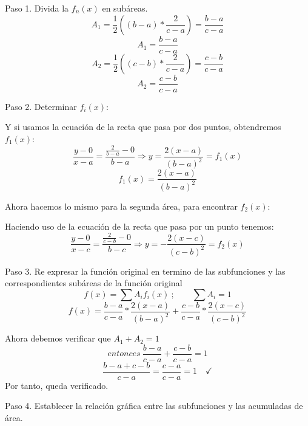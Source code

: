 \documentclass[11pt,letterpaper]{report}
\begin{document}
Paso 1. Divida la $f_n(x)$ en subáreas.
\[
A_1 = \frac{1}{2}\left((b-a) * \frac{2}{c-a}\right) = \frac{b-a}{c-a}
\]
\[
\boxed{A_1 = \frac{b-a}{c-a}}
\]
\[
A_2 = \frac{1}{2}\left((c-b) * \frac{2}{c-a}\right) = \frac{c-b}{c-a}
\]
\[
\boxed{A_2 = \frac{c-b}{c-a}}
\]

Paso 2. Determinar $f_i(x)$:

\begin{center}
\end{center}

Y si usamos la ecuación de la recta que pasa por dos puntos, obtendremos $f_1(x)$:
\[
\frac{y - 0}{x - a} = \frac{\frac{2}{b-a} - 0}{b - a} \Rightarrow y = \frac{2(x-a)}{(b-a)^2} = f_1(x)
\]
\[
f_1(x) = \frac{2(x-a)}{(b-a)^2}
\]

Ahora hacemos lo mismo para la segunda área, para encontrar $f_2(x)$:

\begin{center}
\end{center}

Haciendo uso de la ecuación de la recta que pasa por un punto tenemos:
\[
\frac{y - 0}{x - c} = \frac{\frac{2}{c-b} - 0}{b - c} \Rightarrow y = -\frac{2(x-c)}{(c-b)^2} = f_2(x)
\]

Paso 3. Re expresar la función original en termino de las subfunciones y las correspondientes subáreas de la función original
\[
f(x) = \sum A_i f_i(x)\ ;\qquad \sum A_i = 1
\]
\[
f(x) = \frac{b-a}{c-a} * \frac{2(x-a)}{(b-a)^2} + \frac{c-b}{c-a} * \frac{2(x-c)}{(c-b)^2}
\]

Ahora debemos verificar que $A_1 + A_2 = 1$
\[
entonces\ \frac{b-a}{c-a} + \frac{c-b}{c-a} = 1
\]
\[
\frac{b - a + c - b}{c-a} = \frac{c-a}{c-a} = 1 \quad \checkmark
\]
Por tanto, queda verificado.

Paso 4. Establecer la relación gráfica entre las subfunciones y las acumuladas de área.
\end{document}
